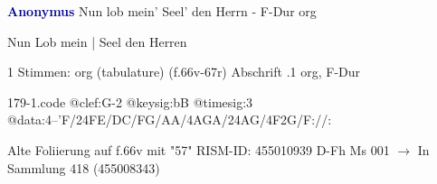 \documentclass[twocolumn]{book}
\begin{document}
\newline \par \vspace{7pt} \textcolor{darkblue}{\textbf{Anonymus  }}
\newline Nun lob mein' Seel' den Herrn - F-Dur
\newline org
\newline \begin{itshape}[f.66v, at left:] Nun Lob mein | Seel den Herren\end{itshape} 
\newline \textcolor{darkblue}{}  1 Stimmen: org (tabulature)  (f.66v-67r)
\newline Abschrift
.1  org, F-Dur  
\begin{filecontents*}{179-1.code}
@clef:G-2
@keysig:bB
@timesig:3
@data:4--'F/24FE/DC/FG/AA/4AGA/24AG/4F2G/F://:
\end{filecontents*}
\newline
%
\newline Alte Foliierung auf f.66v mit "57"
\newline RISM-ID: 455010939
\newline D-Fh  Ms 001
\newline $\rightarrow$ In Sammlung 418 (455008343)
      
\end{document}
